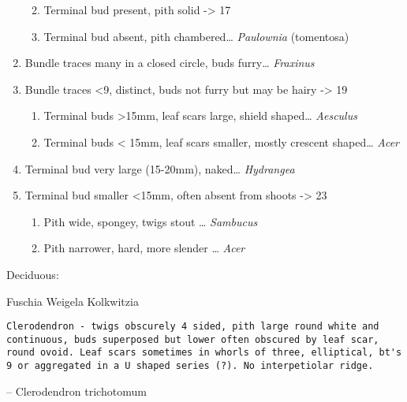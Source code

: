 \documentclass[openany]{book}
\providecommand{\tightlist}{%
  \setlength{\itemsep}{0pt}\setlength{\parskip}{0pt}}
\begin{document}
\begin{enumerate}
  \begin{enumerate}
  \def\labelenumii{\arabic{enumii}.}
  \setcounter{enumii}{14}
  \tightlist
  \item
    Terminal bud present, pith solid -\textgreater{} 17
  \item
    Terminal bud absent, pith chambered\ldots{} \emph{Paulownia}
    (tomentosa)
  \end{enumerate}
\item
  Bundle traces many in a closed circle, buds furry\ldots{}
  \emph{Fraxinus}
\item
  Bundle traces \textless{}9, distinct, buds not furry but may be hairy
  -\textgreater{} 19

  \begin{enumerate}
  \def\labelenumii{\arabic{enumii}.}
  \setcounter{enumii}{18}
  \tightlist
  \item
    Terminal buds \textgreater{}15mm, leaf scars large, shield
    shaped\ldots{} \emph{Aesculus}
  \item
    Terminal buds \textless{} 15mm, leaf scars smaller, mostly crescent
    shaped\ldots{} \emph{Acer}
  \end{enumerate}
\item
  Terminal bud very large (15-20mm), naked\ldots{} \emph{Hydrangea}
\item
  Terminal bud smaller \textless{}15mm, often absent from shoots
  -\textgreater{} 23

  \begin{enumerate}
  \def\labelenumii{\arabic{enumii}.}
  \setcounter{enumii}{22}
  \tightlist
  \item
    Pith wide, spongey, twigs stout \ldots{} \emph{Sambucus}
  \item
    Pith narrower, hard, more slender \ldots{} \emph{Acer}
  \end{enumerate}
\end{enumerate}

Deciduous:

Fuschia Weigela Kolkwitzia

\begin{verbatim}
Clerodendron - twigs obscurely 4 sided, pith large round white and continuous, buds superposed but lower often obscured by leaf scar, round ovoid. Leaf scars sometimes in whorls of three, elliptical, bt's 9 or aggregated in a U shaped series (?). No interpetiolar ridge.
\end{verbatim}

-- Clerodendron trichotomum
\end{document}
